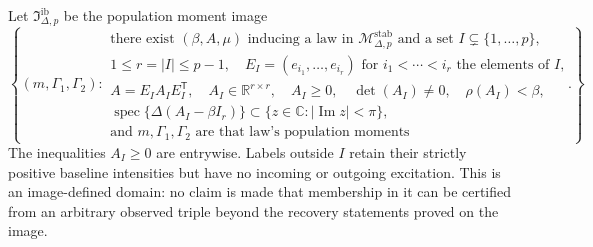 Let \(\mathfrak I_{\Delta,p}^{\mathrm{ib}}\) be the population moment image
\[
 \left\{(m,\Gamma_1,\Gamma_2):\begin{array}{l}
 \text{there exist }(\beta,A,\mu)\text{ inducing a law in }\mathcal M_{\Delta,p}^{\mathrm{stab}}\text{ and a set }I\subsetneq\{1,\ldots,p\},\\
 1\leq r=|I|\leq p-1,\quad E_I=(e_{i_1},\ldots,e_{i_r})\text{ for }i_1<\cdots<i_r\text{ the elements of }I,\\
 A=E_IA_IE_I^{\mathsf T},\quad A_I\in\mathbb R^{r\times r},\quad A_I\geq0,\quad \det(A_I)\neq0,\quad \rho(A_I)<\beta,\\
 \operatorname{spec}\{\Delta(A_I-\beta I_r)\}\subset\{z\in\mathbb C:|\operatorname{Im}z|<\pi\},\\
 \text{and }m,\Gamma_1,\Gamma_2\text{ are that law's population moments}
 \end{array}\right\}.
\]
The inequalities \(A_I\geq0\) are entrywise.  Labels outside \(I\) retain their strictly positive baseline intensities but have no incoming or outgoing excitation.  This is an image-defined domain: no claim is made that membership in it can be certified from an arbitrary observed triple beyond the recovery statements proved on the image.